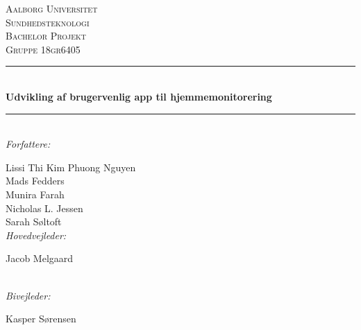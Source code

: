 \thispagestyle{empty}
\newcommand{\HRule}{\rule{\linewidth}{0.5mm}} %

\begin{center} %

\textsc{\LARGE Aalborg Universitet}\\[1.0cm] %
\textsc{\Large Sundhedsteknologi}\\[0.5cm] %
\textsc{\Large Bachelor Projekt}\\[0.5cm] %
\textsc{\large Gruppe 18gr6405}\\[0.5cm] %


\HRule \\[0.4cm]
{ \huge \bfseries Udvikling af brugervenlig app til hjemmemonitorering}\\[0.2cm] %
\HRule \\[0.4cm]

\emph{Forfattere:}\\
{\large Lissi Thi Kim Phuong Nguyen \\ Mads Fedders \\ Munira Farah \\ Nicholas L. Jessen \\ Sarah Søltoft \\[1.0cm] %

\emph{Hovedvejleder:}\\
{\large Jacob Melgaard \par}\\[0.5cm] %

\emph{Bivejleder:}\\
{\large Kasper Sørensen  \par}\\[2.0cm] %

}
\end{center}
